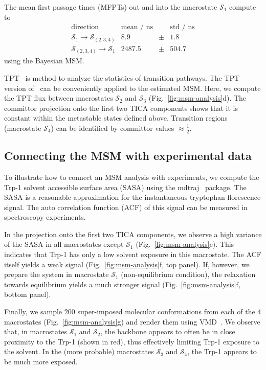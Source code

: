 \documentclass[9pt,tutorial]{livecoms}
\begin{document}
The mean first passage times (MFPTs) out and into the macrostate $\mathcal{S}_1$ compute to
\[ \begin{array}{crcr}
\textrm{direction} & \textrm{mean / ns} && \textrm{std / ns} \\
\hline
\mathcal{S}_1 \to \mathcal{S}_{(2,3,4)} & 8.9 & \pm & 1.8 \\
\mathcal{S}_{(2,3,4)} \to \mathcal{S}_1 & 2487.5 & \pm &  504.7
\end{array}\]
using the Bayesian MSM.

TPT~\cite{weinan-tpt,metzner-msm-tpt} is method to analyze the statistics of transition pathways. The TPT version of~\cite{noe-folding-pathways} can be conveniently applied to the estimated MSM. Here, we compute the TPT flux between macrostates $\mathcal{S}_2$ and $\mathcal{S}_3$ (Fig.~\ref{fig:msm-analysis}d).
The committor projection onto the first two TICA components shows that it is constant within the metastable states defined above.
Transition regions (macrostate $\mathcal{S}_4$) can be identified by committor values $\approx \frac{1}{2}$.

\subsection{Connecting the MSM with experimental data}

To illustrate how to connect an MSM analysis with experiments, we compute the Trp-1 solvent accessible surface area (SASA) using the mdtraj~\cite{mdtraj} package.
The SASA is a reasonable approximation for the instantaneous tryptophan florescence signal.
The auto correlation function (ACF) of this signal can be measured in spectroscopy experiments.

In the projection onto the first two TICA components, we observe a high variance of the SASA in all macrostates except $\mathcal{S}_1$ (Fig.~\ref{fig:msm-analysis}e).
This indicates that Trp-1 has only a low solvent exposure in this macrostate.
The ACF itself yields a weak signal (Fig.~\ref{fig:msm-analysis}f, top panel).
If, however, we prepare the system in macrostate $\mathcal{S}_1$ (non-equilibrium condition), the relaxation towards equilibrium yields a much stronger signal (Fig.~\ref{fig:msm-analysis}f, bottom panel).

Finally, we sample $200$ super-imposed molecular conformations from each of the $4$ macrostates (Fig.~\ref{fig:msm-analysis}g) and render them using VMD~\cite{vmd}.
We observe that, in macrostates $\mathcal{S}_1$ and $\mathcal{S}_2$, the backbone appears to often be in close proximity to the Trp-1 (shown in red), thus effectively limiting Trp-1 exposure to the solvent.
In the (more probable) macrostates $\mathcal{S}_3$ and $\mathcal{S}_4$, the Trp-1 appears to be much more exposed.
\end{document}
